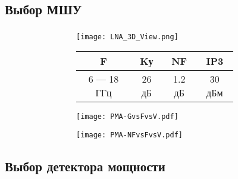 \documentclass[c]{beamer}  %
\begin{document}
\subsection{Выбор МШУ}
	\begin{frame}[shrink=30]
			\frametitle{\insertsection}
			\framesubtitle{\insertsubsection}
			\begin{center}
				\begin{figure}
					\begin{subfigure}[t]{0.5\textwidth}
						\vspace{-1\textheight}%
						\begin{subfigure}[t]{\textwidth}
							\begin{center}
								\texttt{[image: LNA\_3D\_View.png]}
								\vspace*{0.05\textheight} 
							\end{center}
						\end{subfigure}
					
						\begin{subfigure}[b]{\textwidth}
							\begin{center}
								\begin{tabular}{|c|c|c|c|}
									\hline
									F & Kу & NF & IP3 \\
									\hline
									6 --- 18 ГГц & 26 дБ & 1.2 дБ & 30 дБм \\
									\hline
								\end{tabular}
							\end{center}
						\end{subfigure}
					\end{subfigure}%
					\begin{subfigure}[b]{0.5\textwidth}
							\begin{subfigure}[t]{\textwidth}
								\texttt{[image: PMA-GvsFvsV.pdf]}
							\end{subfigure}
						
							\begin{subfigure}[b]{\textwidth}
								\texttt{[image: PMA-NFvsFvsV.pdf]}
							\end{subfigure}
					\end{subfigure}
				\end{figure}
			\end{center}
	\end{frame}

\subsection{Выбор детектора мощности}\label{susec:PD_choosing}
\end{document}
